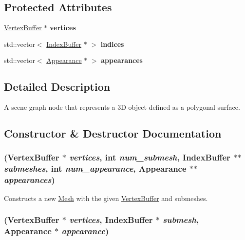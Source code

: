 \subsection*{Protected Attributes}
\begin{CompactItemize}
\item 
\hypertarget{classm3g_1_1Mesh_1a2db0a8bc6986ba148b6b6f5dee271f}{
\hyperlink{classm3g_1_1VertexBuffer}{VertexBuffer} $\ast$ \textbf{vertices}}
\label{classm3g_1_1Mesh_1a2db0a8bc6986ba148b6b6f5dee271f}

\item 
\hypertarget{classm3g_1_1Mesh_7280e670882c2ce658bd600655fb477e}{
std::vector$<$ \hyperlink{classm3g_1_1IndexBuffer}{IndexBuffer} $\ast$ $>$ \textbf{indices}}
\label{classm3g_1_1Mesh_7280e670882c2ce658bd600655fb477e}

\item 
\hypertarget{classm3g_1_1Mesh_6dcb9adb660a04b601286a3ce4500fba}{
std::vector$<$ \hyperlink{classm3g_1_1Appearance}{Appearance} $\ast$ $>$ \textbf{appearances}}
\label{classm3g_1_1Mesh_6dcb9adb660a04b601286a3ce4500fba}

\end{CompactItemize}


\subsection{Detailed Description}
A scene graph node that represents a 3D object defined as a polygonal surface. 

\subsection{Constructor \& Destructor Documentation}
\hypertarget{classm3g_1_1Mesh_2545f0abeee27d408d3129f3a5df40bb}{
\subsubsection[{Mesh}]{ ({\bf VertexBuffer} $\ast$ {\em vertices}, \/  int {\em num\_\-submesh}, \/  {\bf IndexBuffer} $\ast$$\ast$ {\em submeshes}, \/  int {\em num\_\-appearance}, \/  {\bf Appearance} $\ast$$\ast$ {\em appearances})}}
\label{classm3g_1_1Mesh_2545f0abeee27d408d3129f3a5df40bb}


Constructs a new \hyperlink{classm3g_1_1Mesh}{Mesh} with the given \hyperlink{classm3g_1_1VertexBuffer}{VertexBuffer} and submeshes. \hypertarget{classm3g_1_1Mesh_2d7766ebbb63eccd77d0dd8b53b400a3}{
\subsubsection[{Mesh}]{ ({\bf VertexBuffer} $\ast$ {\em vertices}, \/  {\bf IndexBuffer} $\ast$ {\em submesh}, \/  {\bf Appearance} $\ast$ {\em appearance})}}
\label{classm3g_1_1Mesh_2d7766ebbb63eccd77d0dd8b53b400a3}


